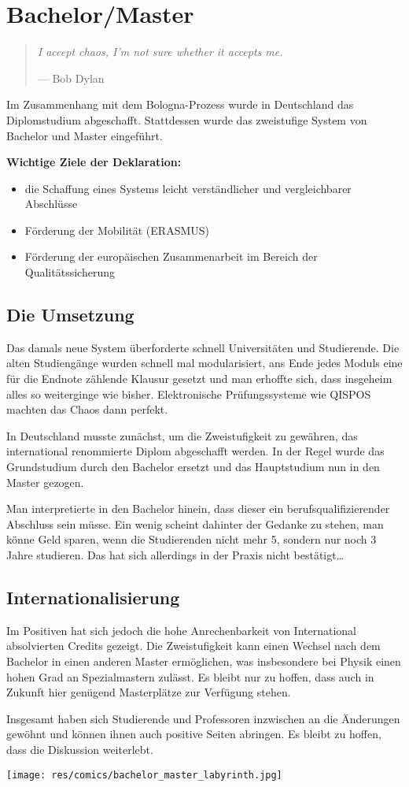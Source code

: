 \section{Bachelor/Master}
\begin{multicols}{2}
\begin{quote}
\textit{I accept chaos, I'm not sure whether it accepts me.}

\hfill--- Bob Dylan
\end{quote}
Im Zusammenhang mit dem Bologna-Prozess wurde in Deutschland das Diplomstudium abgeschafft. Stattdessen wurde das zweistufige System von Bachelor und Master eingeführt.

\textbf{Wichtige Ziele der Deklaration:}
\begin{itemize}
\item die Schaffung eines Systems leicht verständlicher und vergleichbarer Abschlüsse
\item Förderung der Mobilität (ERASMUS)
\item Förderung der europäischen Zusammenarbeit im Bereich der Qualitätssicherung
\end{itemize}

\subsection*{Die Umsetzung}
Das damals neue System überforderte schnell Universitäten und Studierende. Die alten Studiengänge wurden schnell mal modularisiert, ans Ende jedes Moduls eine für die Endnote zählende Klausur gesetzt und man erhoffte sich, dass insgeheim alles so weiterginge wie bisher. Elektronische Prüfungssysteme wie QISPOS machten das Chaos dann perfekt.

In Deutschland musste zunächst, um die Zweistufigkeit zu gewähren, das international renommierte Diplom abgeschafft werden. In der Regel wurde das Grundstudium durch den Bachelor ersetzt und das Hauptstudium nun in den Master gezogen.

Man interpretierte in den Bachelor hinein, dass dieser ein berufsqualifizierender Abschluss sein müsse. Ein wenig scheint dahinter der Gedanke zu stehen, man könne Geld sparen, wenn die Studierenden nicht mehr 5, sondern nur noch 3 Jahre studieren. Das hat sich allerdings in der Praxis nicht bestätigt\dots

\subsection*{Internationalisierung}
Im Positiven hat sich jedoch die hohe Anrechenbarkeit von International absolvierten Credits gezeigt. Die Zweistufigkeit kann einen Wechsel nach dem Bachelor in einen anderen Master ermöglichen, was insbesondere bei Physik einen hohen Grad an Spezialmastern zulässt. Es bleibt nur zu hoffen, dass auch in Zukunft hier genügend Masterplätze zur Verfügung stehen.

Insgesamt haben sich Studierende und Professoren inzwischen an die Änderungen gewöhnt und können ihnen auch positive Seiten abringen. Es bleibt zu hoffen, dass die Diskussion weiterlebt.

\end{multicols}

\begin{center}
\texttt{[image: res/comics/bachelor\_master\_labyrinth.jpg]}
\end{center}
